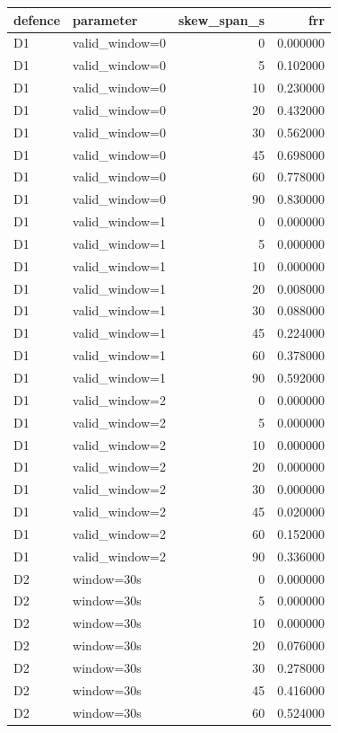 \begin{tabular}{llrr}
\toprule
defence & parameter & skew\_span\_s & frr \\
\midrule
D1 & valid\_window=0 & 0 & 0.000000 \\
D1 & valid\_window=0 & 5 & 0.102000 \\
D1 & valid\_window=0 & 10 & 0.230000 \\
D1 & valid\_window=0 & 20 & 0.432000 \\
D1 & valid\_window=0 & 30 & 0.562000 \\
D1 & valid\_window=0 & 45 & 0.698000 \\
D1 & valid\_window=0 & 60 & 0.778000 \\
D1 & valid\_window=0 & 90 & 0.830000 \\
D1 & valid\_window=1 & 0 & 0.000000 \\
D1 & valid\_window=1 & 5 & 0.000000 \\
D1 & valid\_window=1 & 10 & 0.000000 \\
D1 & valid\_window=1 & 20 & 0.008000 \\
D1 & valid\_window=1 & 30 & 0.088000 \\
D1 & valid\_window=1 & 45 & 0.224000 \\
D1 & valid\_window=1 & 60 & 0.378000 \\
D1 & valid\_window=1 & 90 & 0.592000 \\
D1 & valid\_window=2 & 0 & 0.000000 \\
D1 & valid\_window=2 & 5 & 0.000000 \\
D1 & valid\_window=2 & 10 & 0.000000 \\
D1 & valid\_window=2 & 20 & 0.000000 \\
D1 & valid\_window=2 & 30 & 0.000000 \\
D1 & valid\_window=2 & 45 & 0.020000 \\
D1 & valid\_window=2 & 60 & 0.152000 \\
D1 & valid\_window=2 & 90 & 0.336000 \\
D2 & window=30s & 0 & 0.000000 \\
D2 & window=30s & 5 & 0.000000 \\
D2 & window=30s & 10 & 0.000000 \\
D2 & window=30s & 20 & 0.076000 \\
D2 & window=30s & 30 & 0.278000 \\
D2 & window=30s & 45 & 0.416000 \\
D2 & window=30s & 60 & 0.524000 \\

\end{tabular}
